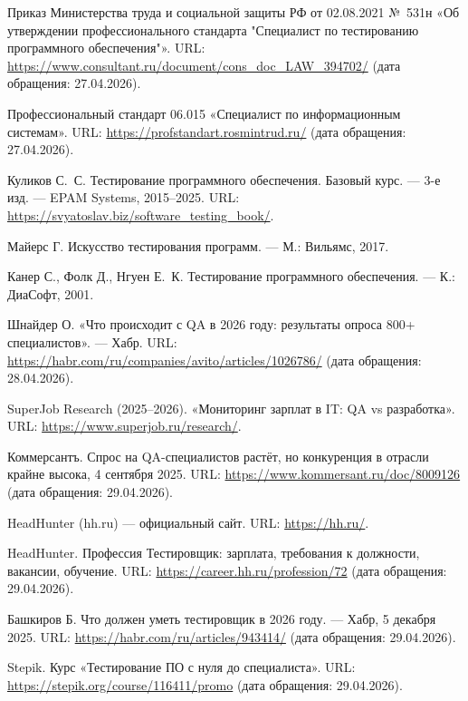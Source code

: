  Приказ Министерства труда и социальной защиты РФ от 02.08.2021 №~531н «Об утверждении профессионального стандарта "Специалист по тестированию программного обеспечения"». URL: \url{https://www.consultant.ru/document/cons_doc_LAW_394702/} (дата обращения: 27.04.2026).

 Профессиональный стандарт 06.015 «Специалист по информационным системам». URL: \url{https://profstandart.rosmintrud.ru/} (дата обращения: 27.04.2026).

 Куликов С.~С. Тестирование программного обеспечения. Базовый курс. --- 3-е изд. --- EPAM Systems, 2015--2025. URL: \url{https://svyatoslav.biz/software_testing_book/}.

 Майерс Г. Искусство тестирования программ. --- М.: Вильямс, 2017.

 Канер С., Фолк Д., Нгуен Е.~К. Тестирование программного обеспечения. --- К.: ДиаСофт, 2001.

 Шнайдер О. «Что происходит с QA в 2026 году: результаты опроса 800+ специалистов». --- Хабр. URL: \url{https://habr.com/ru/companies/avito/articles/1026786/} (дата обращения: 28.04.2026).

 SuperJob Research (2025--2026). «Мониторинг зарплат в IT: QA vs разработка». URL: \url{https://www.superjob.ru/research/}.

 Коммерсантъ. Спрос на QA-специалистов растёт, но конкуренция в отрасли крайне высока, 4 сентября 2025. URL: \url{https://www.kommersant.ru/doc/8009126} (дата обращения: 29.04.2026).

 HeadHunter (hh.ru) --- официальный сайт. URL: \url{https://hh.ru/}.

 HeadHunter. Профессия Тестировщик: зарплата, требования к должности, вакансии, обучение. URL: \url{https://career.hh.ru/profession/72} (дата обращения: 29.04.2026).

 Башкиров Б. Что должен уметь тестировщик в 2026 году. --- Хабр, 5 декабря 2025. URL: \url{https://habr.com/ru/articles/943414/} (дата обращения: 29.04.2026).

 Stepik. Курс «Тестирование ПО с нуля до специалиста». URL: \url{https://stepik.org/course/116411/promo} (дата обращения: 29.04.2026).